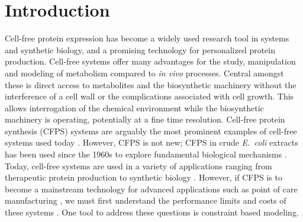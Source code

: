 \documentclass[journal=asbcd6,manuscript=article]{achemso}
\begin{document}
\section{Introduction}
Cell-free protein expression has become a widely used research tool in systems and synthetic biology, and a promising technology for personalized protein production.
Cell-free systems offer many advantages for the study, manipulation and modeling of metabolism compared to \textit{in vivo} processes.
Central amongst these is direct access to metabolites and the biosynthetic machinery without the interference of a cell wall or the complications associated with cell growth.
This allows interrogation of the chemical environment while the biosynthetic machinery is operating, potentially at a fine time resolution.
Cell-free protein synthesis (CFPS) systems are arguably the most prominent examples of cell-free systems used today \cite{Jewett:2008aa}.
However, CFPS is not new; CFPS in crude \textit{E.~coli} extracts has been used since the 1960s to explore fundamental biological mechanisms \cite{MATTHAEI:1961aa,NIRENBERG:1961aa}.
Today, cell-free systems are used in a variety of applications ranging from therapeutic protein production \cite{Lu:2014aa} to synthetic biology \cite{Hodgman:2012aa}.
However, if CFPS is to become a mainstream technology for advanced applications such as point of care manufacturing \cite{Pardee2016248}, we must first understand the performance limits and costs of these systems \cite{Jewett:2008aa}.
One tool to address these questions is constraint based modeling.

\end{document}

